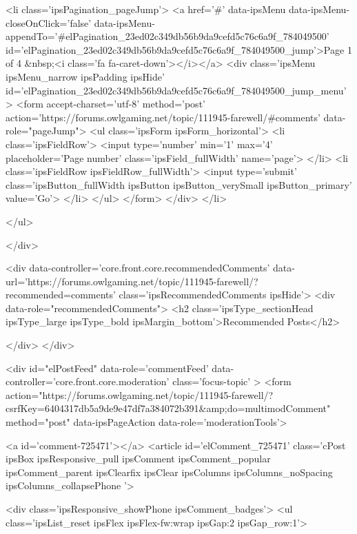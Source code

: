 			
				<li class='ipsPagination_pageJump'>
					<a href='#' data-ipsMenu data-ipsMenu-closeOnClick='false' data-ipsMenu-appendTo='#elPagination_23ed02c349db56b9da9cefd5c76c6a9f_784049500' id='elPagination_23ed02c349db56b9da9cefd5c76c6a9f_784049500_jump'>Page 1 of 4 &nbsp;<i class='fa fa-caret-down'></i></a>
					<div class='ipsMenu ipsMenu_narrow ipsPadding ipsHide' id='elPagination_23ed02c349db56b9da9cefd5c76c6a9f_784049500_jump_menu'>
						<form accept-charset='utf-8' method='post' action='https://forums.owlgaming.net/topic/111945-farewell/#comments' data-role="pageJump">
							<ul class='ipsForm ipsForm_horizontal'>
								<li class='ipsFieldRow'>
									<input type='number' min='1' max='4' placeholder='Page number' class='ipsField_fullWidth' name='page'>
								</li>
								<li class='ipsFieldRow ipsFieldRow_fullWidth'>
									<input type='submit' class='ipsButton_fullWidth ipsButton ipsButton_verySmall ipsButton_primary' value='Go'>
								</li>
							</ul>
						</form>
					</div>
				</li>
			
		
	</ul>

					
				</div>
			
	

	

<div data-controller='core.front.core.recommendedComments' data-url='https://forums.owlgaming.net/topic/111945-farewell/?recommended=comments' class='ipsRecommendedComments ipsHide'>
	<div data-role="recommendedComments">
		<h2 class='ipsType_sectionHead ipsType_large ipsType_bold ipsMargin_bottom'>Recommended Posts</h2>
		
	</div>
</div>
	
	<div id="elPostFeed" data-role='commentFeed' data-controller='core.front.core.moderation' class='focus-topic' >
		<form action="https://forums.owlgaming.net/topic/111945-farewell/?csrfKey=6404317db5a9de9e47df7a384072b391&amp;do=multimodComment" method="post" data-ipsPageAction data-role='moderationTools'>
			
			
				
					
					
					



<a id='comment-725471'></a>
<article  id='elComment_725471' class='cPost ipsBox ipsResponsive_pull  ipsComment ipsComment_popular ipsComment_parent ipsClearfix ipsClear ipsColumns ipsColumns_noSpacing ipsColumns_collapsePhone    '>
	

	
		<div class='ipsResponsive_showPhone ipsComment_badges'>
			<ul class='ipsList_reset ipsFlex ipsFlex-fw:wrap ipsGap:2 ipsGap_row:1'>
				
